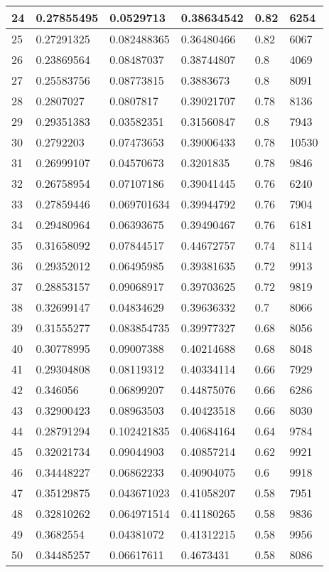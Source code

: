 \begin{longtable}{|l|l|l|l|l|l|}
24 & 0.27855495 & 0.0529713 & 0.38634542 & 0.82 & 6254 \\ \hline 
25 & 0.27291325 & 0.082488365 & 0.36480466 & 0.82 & 6067 \\ \hline 
26 & 0.23869564 & 0.08487037 & 0.38744807 & 0.8 & 4069 \\ \hline 
27 & 0.25583756 & 0.08773815 & 0.3883673 & 0.8 & 8091 \\ \hline 
28 & 0.2807027 & 0.0807817 & 0.39021707 & 0.78 & 8136 \\ \hline 
29 & 0.29351383 & 0.03582351 & 0.31560847 & 0.8 & 7943 \\ \hline 
30 & 0.2792203 & 0.07473653 & 0.39006433 & 0.78 & 10530 \\ \hline 
31 & 0.26999107 & 0.04570673 & 0.3201835 & 0.78 & 9846 \\ \hline 
32 & 0.26758954 & 0.07107186 & 0.39041445 & 0.76 & 6240 \\ \hline 
33 & 0.27859446 & 0.069701634 & 0.39944792 & 0.76 & 7904 \\ \hline 
34 & 0.29480964 & 0.06393675 & 0.39490467 & 0.76 & 6181 \\ \hline 
35 & 0.31658092 & 0.07844517 & 0.44672757 & 0.74 & 8114 \\ \hline 
36 & 0.29352012 & 0.06495985 & 0.39381635 & 0.72 & 9913 \\ \hline 
37 & 0.28853157 & 0.09068917 & 0.39703625 & 0.72 & 9819 \\ \hline 
38 & 0.32699147 & 0.04834629 & 0.39636332 & 0.7 & 8066 \\ \hline 
39 & 0.31555277 & 0.083854735 & 0.39977327 & 0.68 & 8056 \\ \hline 
40 & 0.30778995 & 0.09007388 & 0.40214688 & 0.68 & 8048 \\ \hline 
41 & 0.29304808 & 0.08119312 & 0.40334114 & 0.66 & 7929 \\ \hline 
42 & 0.346056 & 0.06899207 & 0.44875076 & 0.66 & 6286 \\ \hline 
43 & 0.32900423 & 0.08963503 & 0.40423518 & 0.66 & 8030 \\ \hline 
44 & 0.28791294 & 0.102421835 & 0.40684164 & 0.64 & 9784 \\ \hline 
45 & 0.32021734 & 0.09044903 & 0.40857214 & 0.62 & 9921 \\ \hline 
46 & 0.34448227 & 0.06862233 & 0.40904075 & 0.6 & 9918 \\ \hline 
47 & 0.35129875 & 0.043671023 & 0.41058207 & 0.58 & 7951 \\ \hline 
48 & 0.32810262 & 0.064971514 & 0.41180265 & 0.58 & 9836 \\ \hline 
49 & 0.3682554 & 0.04381072 & 0.41312215 & 0.58 & 9956 \\ \hline 
50 & 0.34485257 & 0.06617611 & 0.4673431 & 0.58 & 8086 \\ \hline 
\end{longtable}